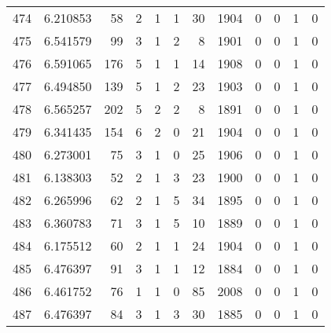 \begin{tabular}{lrrrrrrrrrrr}
474 &  6.210853 &   58 &      2 &        1 &      1 &              30 &  1904 &               0 &               0 &               1 &               0 \\
475 &  6.541579 &   99 &      3 &        1 &      2 &               8 &  1901 &               0 &               0 &               1 &               0 \\
476 &  6.591065 &  176 &      5 &        1 &      1 &              14 &  1908 &               0 &               0 &               1 &               0 \\
477 &  6.494850 &  139 &      5 &        1 &      2 &              23 &  1903 &               0 &               0 &               1 &               0 \\
478 &  6.565257 &  202 &      5 &        2 &      2 &               8 &  1891 &               0 &               0 &               1 &               0 \\
479 &  6.341435 &  154 &      6 &        2 &      0 &              21 &  1904 &               0 &               0 &               1 &               0 \\
480 &  6.273001 &   75 &      3 &        1 &      0 &              25 &  1906 &               0 &               0 &               1 &               0 \\
481 &  6.138303 &   52 &      2 &        1 &      3 &              23 &  1900 &               0 &               0 &               1 &               0 \\
482 &  6.265996 &   62 &      2 &        1 &      5 &              34 &  1895 &               0 &               0 &               1 &               0 \\
483 &  6.360783 &   71 &      3 &        1 &      5 &              10 &  1889 &               0 &               0 &               1 &               0 \\
484 &  6.175512 &   60 &      2 &        1 &      1 &              24 &  1904 &               0 &               0 &               1 &               0 \\
485 &  6.476397 &   91 &      3 &        1 &      1 &              12 &  1884 &               0 &               0 &               1 &               0 \\
486 &  6.461752 &   76 &      1 &        1 &      0 &              85 &  2008 &               0 &               0 &               1 &               0 \\
487 &  6.476397 &   84 &      3 &        1 &      3 &              30 &  1885 &               0 &               0 &               1 &               0 \\

\end{tabular}
